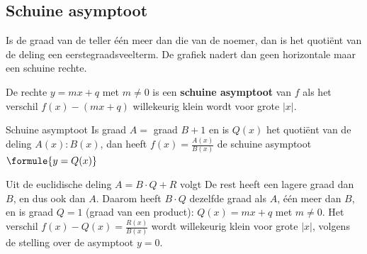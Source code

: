 \begin{oefeningen}
\end{oefeningen}

\subsection{Schuine asymptoot}

Is de graad van de teller één meer dan die van de noemer, dan is het quotiënt van de deling een eerstegraadsveelterm. De grafiek nadert dan geen horizontale maar een schuine rechte.

\begin{theorie}
De rechte $y = mx + q$ met $m \neq 0$ is een \textbf{\textcolor{accent}{schuine asymptoot}} van $f$ als het verschil $f(x) - (mx + q)$ willekeurig klein wordt voor grote $|x|$.

\begin{stelling}{Schuine asymptoot}
Is graad $A =$ graad $B + 1$ en is $Q(x)$ het quotiënt van de deling $A(x) : B(x)$, dan heeft $f(x) = \frac{A(x)}{B(x)}$ de schuine asymptoot \quad $\formule{y = Q(x)}$
\end{stelling}

\begin{bewijs}
Uit de euclidische deling $A = B \cdot Q + R$ volgt
De rest heeft een lagere graad dan $B$, en dus ook dan $A$. Daarom heeft $B \cdot Q$ dezelfde graad als $A$, één meer dan $B$, en is graad $Q = 1$ (graad van een product): $Q(x) = mx + q$ met $m \neq 0$. Het verschil $f(x) - Q(x) = \frac{R(x)}{B(x)}$ wordt willekeurig klein voor grote $|x|$, volgens de stelling over de asymptoot $y = 0$.
\end{bewijs}
\end{theorie}


